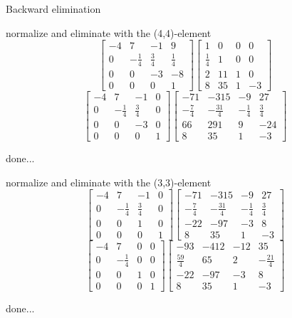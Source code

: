 \documentclass[12pt]{article}
\begin{document}
\par\noindent Backward elimination


normalize and eliminate with the (4,4)-element
$$\left[{\begin{array}{cccc}-4& 7& -1& 9\\ 0& -\frac{1}{4}& \frac{3}{4}& \frac{1}{4}\\ 0& 0& -3& -8\\ 0& 0& 0& 1\end{array}}\right]\left[{\begin{array}{cccc}1& 0& 0& 0\\ \frac{1}{4}& 1& 0& 0\\ 2& 11& 1& 0\\ 8& 35& 1& -3\end{array}}\right]$$
$$\left[{\begin{array}{cccc}-4& 7& -1& 0\\ 0& -\frac{1}{4}& \frac{3}{4}& 0\\ 0& 0& -3& 0\\ 0& 0& 0& 1\end{array}}\right]\left[{\begin{array}{cccc}-71& -315& -9& 27\\ -\frac{7}{4}& -\frac{31}{4}& -\frac{1}{4}& \frac{3}{4}\\ 66& 291& 9& -24\\ 8& 35& 1& -3\end{array}}\right]$$
\par\noindent done...


normalize and eliminate with the (3,3)-element
$$\left[{\begin{array}{cccc}-4& 7& -1& 0\\ 0& -\frac{1}{4}& \frac{3}{4}& 0\\ 0& 0& 1& 0\\ 0& 0& 0& 1\end{array}}\right]\left[{\begin{array}{cccc}-71& -315& -9& 27\\ -\frac{7}{4}& -\frac{31}{4}& -\frac{1}{4}& \frac{3}{4}\\ -22& -97& -3& 8\\ 8& 35& 1& -3\end{array}}\right]$$
$$\left[{\begin{array}{cccc}-4& 7& 0& 0\\ 0& -\frac{1}{4}& 0& 0\\ 0& 0& 1& 0\\ 0& 0& 0& 1\end{array}}\right]\left[{\begin{array}{cccc}-93& -412& -12& 35\\ \frac{59}{4}& 65& 2& -\frac{21}{4}\\ -22& -97& -3& 8\\ 8& 35& 1& -3\end{array}}\right]$$
\par\noindent done...
\end{document}

